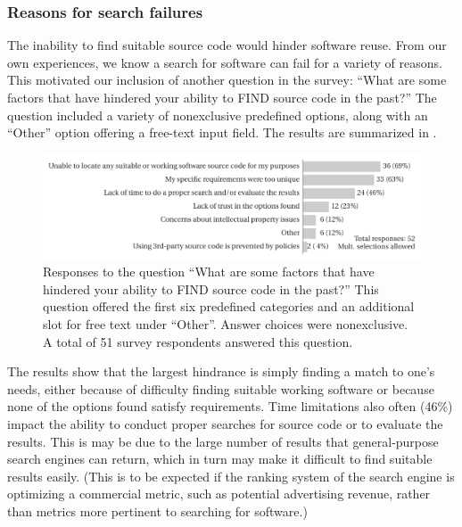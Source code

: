 \documentclass{casicswhitepaper}
\begin{document}
\subsubsection{Reasons for search failures}
\label{reasons-for-search-failure}

The inability to find suitable source code would hinder software reuse.  From our own experiences, we know a search for software can fail for a variety of reasons.  This motivated our inclusion of another question in the survey: ``What are some factors that have hindered your ability to FIND source code in the past?''  The question included a variety of nonexclusive predefined options, along with an ``Other'' option offering a free-text input field.  The results are summarized in .

\begin{figure}[htb]
  \vspace*{-2ex}
  \centering
  \includegraphics[width=6.5in]{files/plots/factors-that-hindered-finding-src.pdf}
  \vspace*{-4ex}
  \caption{Responses to the question ``What are some factors that have hindered your ability to FIND source code in the past?''  This question offered the first six predefined categories and an additional slot for free text under ``Other''.  Answer choices were nonexclusive.  A total of 51 survey respondents answered this question.}
  \label{factors-that-hindered}
\end{figure}

The results show that the largest hindrance is simply finding a match to one's needs, either because of difficulty finding suitable working software or because none of the options found satisfy requirements.  Time limitations also often (46\%) impact the ability to conduct proper searches for source code or to evaluate the results.  This is may be due to the large number of results that general-purpose search engines can return, which in turn may make it difficult to find suitable results easily.  (This is to be expected if the ranking system of the search engine is optimizing a commercial metric, such as potential advertising revenue, rather than metrics more pertinent to searching for software.)
\end{document}
